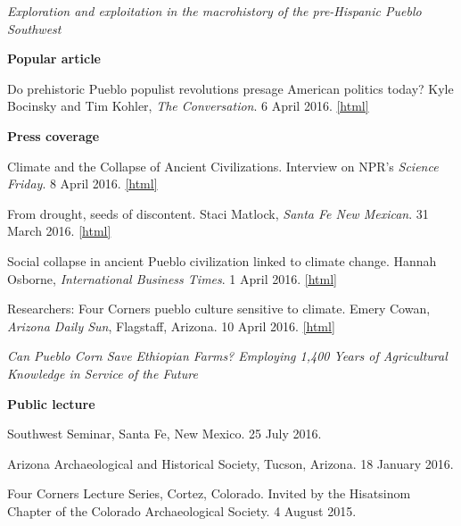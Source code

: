 \emph{Exploration and exploitation in the macrohistory of the pre-Hispanic Pueblo Southwest}
\nopagebreak
\begin{list1}
\item[] {\bf Popular article}
\begin{list2}
\item[-] Do prehistoric Pueblo populist revolutions presage American politics today? Kyle Bocinsky and Tim Kohler, \emph{The Conversation}. 6 April 2016. \href{https://theconversation.com/do-prehistoric-pueblo-populist-revolutions-presage-american-politics-today-57098}{[html]}
\end{list2}

\item[] {\bf Press coverage}
\begin{list2}
\item[-] Climate and the Collapse of Ancient Civilizations. Interview on NPR's \emph{Science Friday}. 8 April 2016. \href{https://www.sciencefriday.com/segments/climate-and-the-collapse-of-ancient-civilizations/}{[html]}

\item[-] From drought, seeds of discontent. Staci Matlock, \emph{Santa Fe New Mexican}. 31 March 2016. \href{https://www.santafenewmexican.com/life/features/from-drought-seeds-of-discontent/article_8de049ea-ea1f-53a6-8444-7ba3884dc508.html}{[html]}

\item[-] Social collapse in ancient Pueblo civilization linked to climate change. Hannah Osborne, \emph{International Business Times}. 1 April 2016. \href{https://www.ibtimes.co.uk/social-collapse-ancient-pueblo-civilisation-linked-climate-change-1552706}{[html]}

\item[-] Researchers: Four Corners pueblo culture sensitive to climate. Emery Cowan, \emph{Arizona Daily Sun}, Flagstaff, Arizona. 10 April 2016. \href{https://azdailysun.com/news/local/researchers-four-corners-pueblo-culture-sensitive-to-climate/article_1703fcdd-ed87-5554-b773-19f47044dbdc.html}{[html]}
\end{list2}
\end{list1}

\emph{Can Pueblo Corn Save Ethiopian Farms? Employing 1,400 Years of Agricultural Knowledge in Service of the Future}
\nopagebreak
\begin{list1}
\item[] {\bf Public lecture}
\begin{list2}
\item[-] Southwest Seminar, Santa Fe, New Mexico. 25 July 2016.

\item[-] Arizona Archaeological and Historical Society, Tucson, Arizona. 18 January 2016.

\item[-] Four Corners Lecture Series, Cortez, Colorado. Invited by the Hisatsinom Chapter of the Colorado Archaeological Society. 4 August 2015.
\end{list2}

\end{list1}

